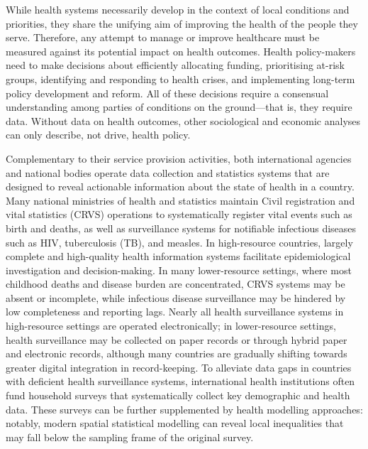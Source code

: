 \documentclass[
]{report}
\begin{document}
While health systems necessarily develop in the context of local conditions and priorities, they share the unifying aim of improving the health of the people they serve. Therefore, any attempt to manage or improve healthcare must be measured against its potential impact on health outcomes.\autocite{Roberts2008} Health policy-makers need to make decisions about efficiently allocating funding, prioritising at-risk groups, identifying and responding to health crises, and implementing long-term policy development and reform. All of these decisions require a consensual understanding among parties of conditions on the ground---that is, they require data.\autocite{AbouZahr2015} Without data on health outcomes, other sociological and economic analyses can only describe, not drive, health policy.\autocite{Roberts2008}

Complementary to their service provision activities, both international agencies and national bodies operate data collection and statistics systems that are designed to reveal actionable information about the state of health in a country. Many national ministries of health and statistics maintain Civil registration and vital statistics (CRVS) operations to systematically register vital events such as birth and deaths, as well as surveillance systems for notifiable infectious diseases such as HIV, tuberculosis (TB), and measles. In high-resource countries, largely complete and high-quality health information systems facilitate epidemiological investigation and decision-making. In many lower-resource settings, where most childhood deaths and disease burden are concentrated, CRVS systems may be absent or incomplete, while infectious disease surveillance may be hindered by low completeness and reporting lags. Nearly all health surveillance systems in high-resource settings are operated electronically; in lower-resource settings, health surveillance may be collected on paper records or through hybrid paper and electronic records, although many countries are gradually shifting towards greater digital integration in record-keeping.\autocite{Rao2019} To alleviate data gaps in countries with deficient health surveillance systems, international health institutions often fund household surveys that systematically collect key demographic and health data. These surveys can be further supplemented by health modelling approaches: notably, modern spatial statistical modelling can reveal local inequalities that may fall below the sampling frame of the original survey.\autocite{Diggle2016}
\end{document}
